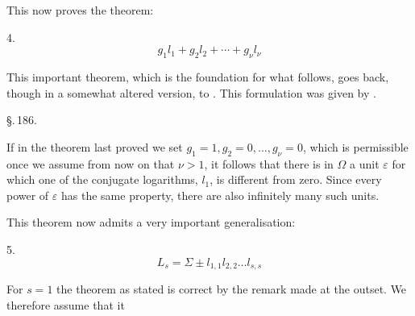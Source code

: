 This now proves the theorem:

4. 
\[
g_1 l_1 + g_2 l_2 + \cdots + g_\nu l_\nu
\]

This important theorem, which is the foundation for what follows, goes back, though in a somewhat altered version, to . This formulation was given by .

\begin{center}
\S.\,186.\\
\end{center}

If in the theorem last proved we set $g_1 = 1, g_2 = 0, \ldots, g_\nu = 0$, which is permissible once we assume from now on that $\nu > 1$, it follows that there is in $\Omega$ a unit $\varepsilon$ for which one of the conjugate logarithms, $l_1$, is different from zero. Since every power of $\varepsilon$ has the same property, there are also infinitely many such units.

This theorem now admits a very important generalisation:

5. 
\[
L_s = \Sigma \pm l_{1,1} l_{2,2} \ldots l_{s,s}
\]

For $s = 1$ the theorem as stated is correct by the remark made at the outset. We therefore assume that it
